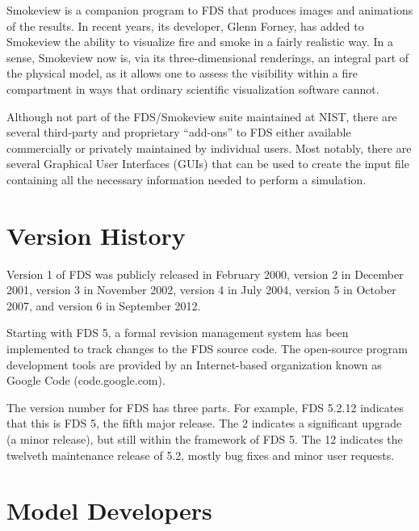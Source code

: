 \documentclass[11pt]{book}
\begin{document}
Smokeview is a companion program to FDS that produces images and animations of the results. In recent years, its developer, Glenn Forney, has added
to Smokeview the ability to visualize fire and smoke in a fairly realistic way. In a sense, Smokeview now is, via its three-dimensional renderings,
an integral part of the physical model, as it allows one to assess the visibility within a fire compartment in ways that ordinary scientific
visualization software cannot.

Although not part of the FDS/Smokeview suite maintained at NIST, there are several third-party and proprietary ``add-ons'' to FDS either available
commercially or privately maintained by individual users. Most notably, there are several Graphical User Interfaces (GUIs) that can be used to create
the input file containing all the necessary information needed to perform a simulation.



\section{Version History}

Version 1 of FDS was publicly released in February 2000, version 2 in December 2001, version 3 in November 2002, version 4 in July 2004, version 5 in October 2007, and version 6 in September 2012.

Starting with FDS 5, a formal revision management system has been implemented to track changes to the FDS source code. The open-source program
development tools are provided by an Internet-based organization known as Google Code (code.google.com).

The version number for FDS has three parts.  For example, FDS 5.2.12 indicates that this is FDS 5, the fifth major release. The 2 indicates a
significant upgrade (a minor release), but still within the framework of FDS 5.  The 12 indicates the twelveth maintenance release of 5.2, mostly bug fixes and minor user
requests.


\section{Model Developers}
\end{document}
